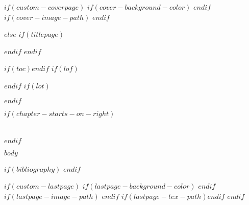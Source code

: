 \documentclass[$if(fontsize)$$fontsize$,$endif$$for(classoption)$$classoption$$sep$,$endfor$]{scrbook}
\begin{document}
$if(custom-coverpage)$
  \thispagestyle{empty}
  $if(cover-background-color)$
    \AddToShipoutPicture*{\AtPageLowerLeft{\color{coverbgcolor}\rule{\paperwidth}{\paperheight}}}
  $endif$
  $if(cover-image-path)$
  $endif$
$else$
  $if(titlepage)$\maketitle$endif$
$endif$

\frontmatter
$if(toc)$\tableofcontents$endif$
$if(lof)$\listoffigures$endif$
$if(lot)$\listoftables$endif$

\mainmatter
$if(chapter-starts-on-right)$\preto\chapter{\cleardoublepage}$endif$

$body$

\backmatter
$if(bibliography)$
  \printbibliography
$endif$

$if(custom-lastpage)$
  \cleardoublepage
  \thispagestyle{empty}
  $if(lastpage-background-color)$
    \AddToShipoutPicture*{\AtPageLowerLeft{\color{lastpagebgcolor}\rule{\paperwidth}{\paperheight}}}
  $endif$
  $if(lastpage-image-path)$
  $endif$
  $if(lastpage-tex-path)$$endif$
  \clearpage
$endif$
\end{document}
